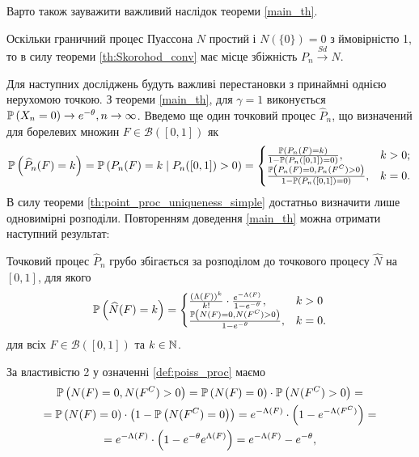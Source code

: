 Варто також зауважити важливий наслідок теореми \ref{main_th}.
\begin{corollary*}[\ref{main_th}]
    Оскільки граничний процес Пуассона $N$ простий і $N\left(\{0\}\right) = 0$ з ймовірністю 1, то в силу теореми
    \eqref{th:Skorohod_conv} має місце збіжність $P_n \overset{Sd}{\longrightarrow} N$.
\end{corollary*}

Для наступних досліджень будуть важливі перестановки з принаймні однією нерухомою точкою.
З теореми \ref{main_th}, для $\gamma = 1$ виконується $\P{X_n = 0} \to e^{-\theta}, n \to \infty$. 
Введемо ще один точковий процес $\widehat{P}_n$, що визначений для борелевих множин $F \in \mathcal{B}([0, 1])$ як 
\begin{gather}
    \P{\widehat{P}_n (F) = k} = \P{P_n(F) = k \mid P_n([0, 1]) > 0} = \begin{cases}
        \frac{\P{P_n(F) = k}}{1 - \P{P_n([0, 1]) = 0}}, & k > 0; \\
        \frac{\P{P_n(F) = 0, P_n(F^C) > 0}}{1 - \P{P_n([0, 1]) = 0}}, & k = 0.
    \end{cases} 
\end{gather}
В силу теореми \ref{th:point_proc_uniqueness_simple} достатньо визначити лише одновимірні розподіли.
Повторенням доведення \ref{main_th} можна отримати наступний результат:
\begin{theorem}\label{cond_th}
    Точковий процес $\widehat{P}_n$ грубо збігається за розподілом до точкового процесу $\widehat{N}$ на $[0, 1]$, 
    для якого
    \begin{gather}\label{Pn_cond_def}
        \P{\widehat{N} (F) = k} =
        \begin{cases}
            \frac{(\Lambda(F))^k}{k!} \cdot \frac{e^{-\Lambda(F)}}{1 - e^{-\theta}}, & k > 0 \\
            \frac{\P{N(F) = 0, N(F^C) > 0}}{1 - e^{-\theta}}, & k = 0.
        \end{cases}
    \end{gather}
    для всіх $F \in \mathcal{B}([0, 1])$ та $k \in \N$.
\end{theorem}
За властивістю 2 у означенні \ref{def:poiss_proc} маємо
\begin{gather*}
    \P{N(F) = 0, N(F^C) > 0} = \P{N(F) = 0}\cdot \P{N(F^C) > 0} = \\ =
    \P{N(F) = 0} \cdot \left(1 - \P{N(F^C) = 0}\right) = 
    e^{-\Lambda(F)} \cdot \left(1 - e^{-\Lambda(F^C)}\right) = \\ =
    e^{-\Lambda(F)} \cdot \left(1 - e^{-\theta} e^{\Lambda(F)}\right) = 
    e^{-\Lambda(F)} - e^{-\theta},
\end{gather*}
